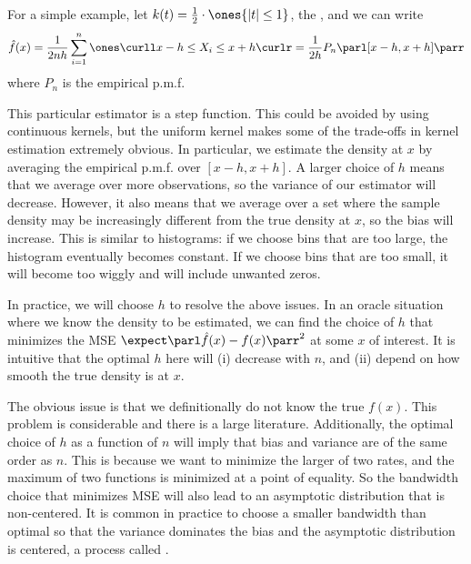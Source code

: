 \documentclass[10pt]{article}
\begin{document}
	
\begin{example}
	For a simple example, let $k(t) = \frac{1}{2}\cdot \ones\{|t|\le 1\}$, the , and we can write\[\hat{f}(x) = \frac{1}{2nh} \sum_{i=1}^n \ones\curll x-h \le X_i \le x+h\curlr = \frac{1}{2h}P_n\parl [x-h,x+h]\parr\]where $P_n$ is the empirical p.m.f.
\end{example}
	
\begin{remark}
	This particular estimator is a step function. This could be avoided by using continuous kernels, but the uniform kernel makes some of the trade-offs in kernel estimation extremely obvious. In particular, we estimate the density at $x$ by averaging the empirical p.m.f. over $[x-h,x+h]$. A larger choice of $h$ means that we average over more observations, so the variance of our estimator will decrease. However, it also means that we average over a set where the sample density may be increasingly different from the true density at $x$, so the bias will increase. This is similar to histograms: if we choose bins that are too large, the histogram eventually becomes constant. If we choose bins that are too small, it will become too wiggly and will include unwanted zeros. 
\end{remark}
\begin{remark}
	In practice, we will choose $h$ to resolve the above issues. In an oracle situation where we know the density to be estimated, we can find the choice of $h$ that minimizes the MSE $\expect \parl \hat{f}(x)-f(x)\parr^2$ at some $x$ of interest. It is intuitive that the optimal $h$ here will (i) decrease with $n$, and (ii) depend on how smooth the true density is at $x$.
	
	The obvious issue is that we definitionally do not know the true $f(x)$. This problem is considerable and there is a large literature. Additionally, the optimal choice of $h$ as a function of $n$ will imply that bias and variance are of the same order as $n$. This is because we want to minimize the larger of two rates, and the maximum of two functions is minimized at a point of equality. So the bandwidth choice that minimizes MSE will also lead to an asymptotic distribution that is non-centered. It is common in practice to choose a smaller bandwidth than optimal so that the variance dominates the bias and the asymptotic distribution is centered, a process called .
\end{remark}
\end{document}
